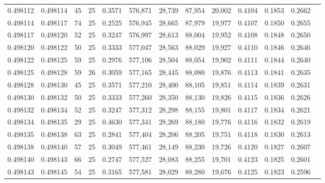 \begin{tabular}{rrrrrrrrrrrrr}
0.498112 & 0.498114 &    45 &  25 &                                     0.3571 & 576,871 &  28,739 &  87,954 &  20,002 & 0.4104 & 0.1853 & 0.2662 \\
0.498114 & 0.498117 &    74 &  25 &                                     0.2525 & 576,945 &  28,665 &  87,979 &  19,977 & 0.4107 & 0.1850 & 0.2655 \\
0.498117 & 0.498120 &    52 &  25 &                                     0.3247 & 576,997 &  28,613 &  88,004 &  19,952 & 0.4108 & 0.1848 & 0.2650 \\
0.498120 & 0.498122 &    50 &  25 &                                     0.3333 & 577,047 &  28,563 &  88,029 &  19,927 & 0.4110 & 0.1846 & 0.2646 \\
0.498122 & 0.498125 &    59 &  25 &                                     0.2976 & 577,106 &  28,504 &  88,054 &  19,902 & 0.4111 & 0.1844 & 0.2640 \\
0.498125 & 0.498128 &    59 &  26 &                                     0.3059 & 577,165 &  28,445 &  88,080 &  19,876 & 0.4113 & 0.1841 & 0.2635 \\
0.498128 & 0.498130 &    45 &  25 &                                     0.3571 & 577,210 &  28,400 &  88,105 &  19,851 & 0.4114 & 0.1839 & 0.2631 \\
0.498130 & 0.498132 &    50 &  25 &                                     0.3333 & 577,260 &  28,350 &  88,130 &  19,826 & 0.4115 & 0.1836 & 0.2626 \\
0.498132 & 0.498134 &    52 &  25 &                                     0.3247 & 577,312 &  28,298 &  88,155 &  19,801 & 0.4117 & 0.1834 & 0.2621 \\
0.498134 & 0.498135 &    29 &  25 &                                     0.4630 & 577,341 &  28,269 &  88,180 &  19,776 & 0.4116 & 0.1832 & 0.2619 \\
0.498135 & 0.498138 &    63 &  25 &                                     0.2841 & 577,404 &  28,206 &  88,205 &  19,751 & 0.4118 & 0.1830 & 0.2613 \\
0.498138 & 0.498140 &    57 &  25 &                                     0.3049 & 577,461 &  28,149 &  88,230 &  19,726 & 0.4120 & 0.1827 & 0.2607 \\
0.498140 & 0.498143 &    66 &  25 &                                     0.2747 & 577,527 &  28,083 &  88,255 &  19,701 & 0.4123 & 0.1825 & 0.2601 \\
0.498143 & 0.498145 &    54 &  25 &                                     0.3165 & 577,581 &  28,029 &  88,280 &  19,676 & 0.4125 & 0.1823 & 0.2596 \\

\end{tabular}
